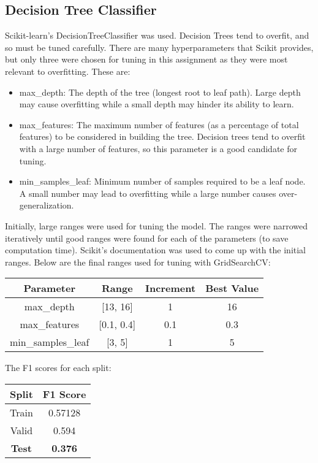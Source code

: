 \documentclass{article}
\begin{document}
\newpage

\subsection{Decision Tree Classifier}
Scikit-learn's DecisionTreeClassifier was used. Decision Trees tend to overfit, and so must be tuned carefully. There are many hyperparameters that Scikit provides, but only three were chosen for tuning in this assignment as they were most relevant to overfitting. These are:

\begin{itemize}
	\item max\_depth: The depth of the tree (longest root to leaf path). Large depth may cause overfitting while a small depth may hinder its ability to learn.
    \item max\_features: The maximum number of features (as a percentage of total features) to be considered in building the tree. Decision trees tend to overfit with a large number of features, so this parameter is a good candidate for tuning.
    \item min\_samples\_leaf: Minimum number of samples required to be a leaf node. A small number may lead to overfitting while a large number causes over-generalization.
\end{itemize}

Initially, large ranges were used for tuning the model. The ranges were narrowed iteratively until good ranges were found for each of the parameters (to save computation time). Scikit's documentation was used to come up with the initial ranges. Below are the final ranges used for tuning with GridSearchCV:

\begin{center}
\begin{tabular}{ |c|c|c|c| } 
	\hline
	\textbf{Parameter} & \textbf{Range} & \textbf{Increment} & \textbf{Best Value} \\ 
	\hline
	max\_depth & [13, 16] & 1 & 16 \\
    max\_features & [0.1, 0.4] & 0.1 & 0.3 \\
    min\_samples\_leaf & [3, 5] & 1 & 5 \\
	\hline
\end{tabular}
\end{center}

The F1 scores for each split:
\begin{center}
\begin{tabular}{ |c|c| } 
	\hline
	\textbf{Split} & \textbf{F1 Score} \\ 
	\hline
	Train & 0.57128 \\
	Valid & 0.594 \\ 
	\textbf{Test} & \textbf{0.376} \\
	\hline
\end{tabular}
\end{center}
\end{document}
